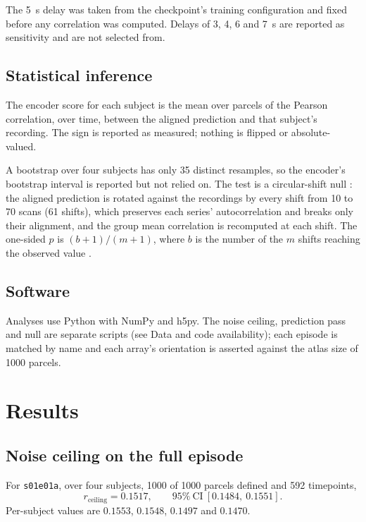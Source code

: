 \documentclass[preprint,12pt]{elsarticle}
\begin{document}
The 5~s delay was taken from the checkpoint's training configuration and fixed before any
correlation was computed. Delays of 3, 4, 6 and 7~s are reported as sensitivity and are not
selected from.

\subsection{Statistical inference}

The encoder score for each subject is the mean over parcels of the Pearson correlation, over
time, between the aligned prediction and that subject's recording. The sign is reported as
measured; nothing is flipped or absolute-valued.

A bootstrap over four subjects has only 35 distinct resamples, so the encoder's bootstrap
interval is reported but not relied on. The test is a circular-shift null
\cite{nastase2019}: the aligned prediction is rotated against the recordings by every shift
from 10 to 70 scans (61 shifts), which preserves each series' autocorrelation and breaks only
their alignment, and the group mean correlation is recomputed at each shift. The one-sided
$p$ is $(b + 1)/(m + 1)$, where $b$ is the number of the $m$ shifts reaching the observed value
\cite{phipson2010}.

\subsection{Software}

Analyses use Python with NumPy and h5py. The noise ceiling, prediction pass and null are
separate scripts (see Data and code availability); each episode is matched by name and each
array's orientation is asserted against the atlas size of 1000 parcels.

\section{Results}
\label{sec:results}

\subsection{Noise ceiling on the full episode}

For \texttt{s01e01a}, over four subjects, 1000 of 1000 parcels defined and 592 timepoints,
\begin{equation}
r_{\text{ceiling}} = 0.1517, \qquad 95\%\ \text{CI}\ [0.1484,\ 0.1551].
\end{equation}
Per-subject values are $0.1553$, $0.1548$, $0.1497$ and $0.1470$.
\end{document}
